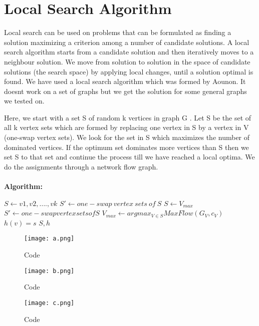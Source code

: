 \documentclass[12pt,a4paper,onecolumn]{article}
\begin{document}
\section{Local Search Algorithm}
Local search can be used on problems that can be formulated as finding a solution maximizing a criterion among a number of candidate solutions.
A local search algorithm starts from a candidate solution and then iteratively moves to a neighbour solution. We move from solution to solution in the space of candidate solutions (the search space) by applying local changes, until a solution optimal is found.
We have used a local search algorithm which was formed by Aounon. It doesnt work on a set of graphs but we get the solution for some general graphs we tested on.

Here, we start with a set S of random k vertices in graph G . Let S be the set of all k vertex sets which are formed by replacing one vertex in S by a vertex in V (one-swap vertex sets). We look for the set in S which maximizes the number of dominated vertices. If the optimum set dominates more vertices than S then we set S to that set and continue the process till we have reached a local optima. We do the assignments through a network flow graph.\\\\
\textbf{Algorithm:}
\begin{algorithmic}[1]
\STATE $S \leftarrow {v1, v2,…., vk}$
\STATE $S' \leftarrow {one-swap\: vertex\: sets\: of\: S}$
\STATE $S \leftarrow V_{max}$
\STATE $S' \leftarrow {one-swap vertex sets of S}$
\STATE $V_{max} \leftarrow argmax _{V \in S} MaxFlow(G_V , c_V )$
\ENDWHILE 
{}
\STATE $h(v) = s$
\ENDIF
\ENDFOR
\RETURN $S, h$
\ENDIF
\end{algorithmic}

\begin{figure}[H]
 \texttt{[image: a.png]}
  \caption{Code}
  \label{Figure 4}
\end{figure}

\begin{figure}[H]
 \texttt{[image: b.png]}
  \caption{Code}
  \label{Figure 5}
\end{figure}

\begin{figure}[H]
 \texttt{[image: c.png]}
  \caption{Code}
  \label{Figure 6}
\end{figure}
\end{document}
